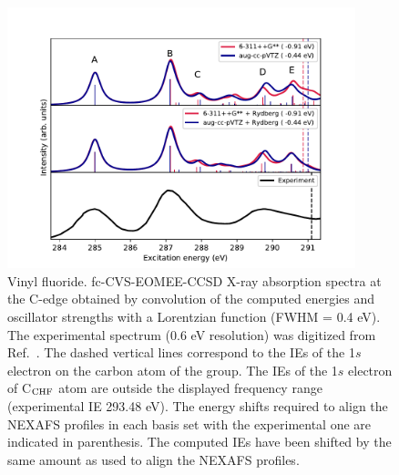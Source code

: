 \documentclass[journal=jctcce,manuscript=article]{achemso}
\begin{document}
\begin{figure}[H]
\includegraphics[width=0.9\textwidth]{Spectra/CH2CHF.pdf}  
\caption{Vinyl fluoride. fc-CVS-EOMEE-CCSD X-ray absorption spectra at the C-edge obtained by convolution of the computed energies and oscillator strengths with a Lorentzian function (FWHM = 0.4 eV). The experimental spectrum (0.6 eV resolution) was digitized from Ref.~. The dashed vertical lines correspond to the 
IEs of the 1$s$ electron on the carbon atom of the  group. The IEs of the 1$s$ electron of C$_{\ce{CHF}}$ atom are outside the displayed frequency range
(experimental IE 293.48 eV).
The energy shifts 
required to align the NEXAFS profiles in each basis set with the
experimental one are indicated in parenthesis. The computed IEs have been shifted by the same amount as used to align the NEXAFS profiles.
\label{fgr:vinylfluoride:C}}
\end{figure}
\end{document}

